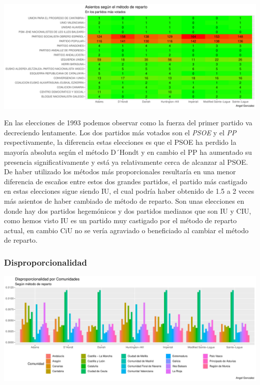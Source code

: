 \documentclass[12pt,a4paper,]{book}
\numberwithin{dummy}{section}
\theoremstyle{ocrenumbox}
\theoremstyle{blacknumex}
\theoremstyle{blacknumbox}
\theoremstyle{ocrenum}
\theoremstyle{ocrenum}
\begin{document}
\begin{center}\includegraphics[width=0.95\linewidth]{figurasR/unnamed-chunk-104-2} \end{center}

En las elecciones de 1993 podemos observar como la fuerza del primer
partido va decreciendo lentamente. Los dos partidos más votados son el
\emph{PSOE} y el \emph{PP} respectivamente, la diferencia estas
elecciones es que el PSOE ha perdido la mayoría absoluta según el método
D´Hondt y en cambio el PP ha aumentado su presencia significativamente y
está ya relativamente cerca de alcanzar al PSOE. De haber utilizado los
métodos más proporcionales resultaría en una menor diferencia de escaños
entre estos dos grandes partidos, el partido más castigado en estas
elecciones sigue siendo IU, el cual podría haber obtenido de 1.5 a 2
veces más asientos de haber cambiado de método de reparto. Son unas
elecciones en donde hay dos partidos hegemónicos y dos partidos medianos
que son IU y CIU, como hemos visto IU es un partido muy castigado por el
método de reparto actual, en cambio CiU no se vería agraviado o
beneficiado al cambiar el método de reparto.

\hypertarget{disproporcionalidad-5}{%
\subsubsection{Disproporcionalidad}\label{disproporcionalidad-5}}

\begin{center}\includegraphics[width=0.95\linewidth]{figurasR/unnamed-chunk-105-1} \end{center}
\end{document}
